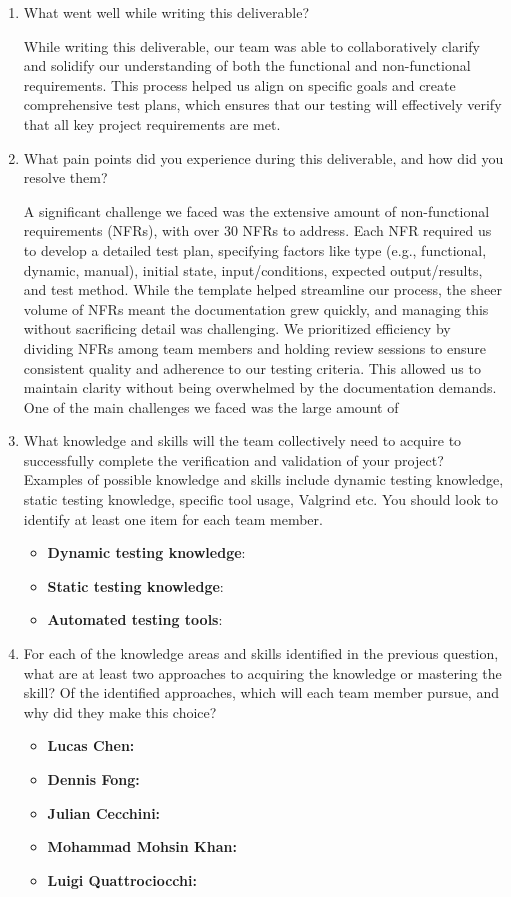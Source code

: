 \documentclass[12pt, titlepage]{article}
\begin{document}
\begin{enumerate}
  \item What went well while writing this deliverable? 

  While writing this deliverable, our team was able to collaboratively clarify and solidify 
  our understanding of both the functional and non-functional requirements. This process helped us align on 
  specific goals and create comprehensive test plans, which ensures that our testing will effectively verify 
  that all key project requirements are met.

  \item What pain points did you experience during this deliverable, and how
    did you resolve them?

  A significant challenge we faced was the extensive amount of non-functional requirements (NFRs), 
  with over 30 NFRs to address. Each NFR required us to develop a detailed test plan, specifying 
  factors like type (e.g., functional, dynamic, manual), initial state, input/conditions, expected 
  output/results, and test method. While the template helped streamline our process, the sheer volume 
  of NFRs meant the documentation grew quickly, and managing this without sacrificing detail was challenging. 
  We prioritized efficiency by dividing NFRs among team members and holding review sessions to ensure consistent 
  quality and adherence to our testing criteria. This allowed us to maintain clarity without being overwhelmed by 
  the documentation demands.
  One of the main challenges we faced was the large amount of 
  \item What knowledge and skills will the team collectively need to acquire to
  successfully complete the verification and validation of your project?
  Examples of possible knowledge and skills include dynamic testing knowledge,
  static testing knowledge, specific tool usage, Valgrind etc.  You should look to
  identify at least one item for each team member.
  \begin{itemize}
    \item \textbf{Dynamic testing knowledge}: 
    \item \textbf{Static testing knowledge}:
    \item \textbf{Automated testing tools}: 
  \end{itemize}

  \item For each of the knowledge areas and skills identified in the previous
  question, what are at least two approaches to acquiring the knowledge or
  mastering the skill?  Of the identified approaches, which will each team
  member pursue, and why did they make this choice?
  \begin{itemize}
    \item \textbf{Lucas Chen:} 
    \item \textbf{Dennis Fong:}
    \item \textbf{Julian Cecchini:} 
    \item \textbf{Mohammad Mohsin Khan:}
    \item \textbf{Luigi Quattrociocchi:}
\end{itemize}
\end{enumerate}
\end{document}
